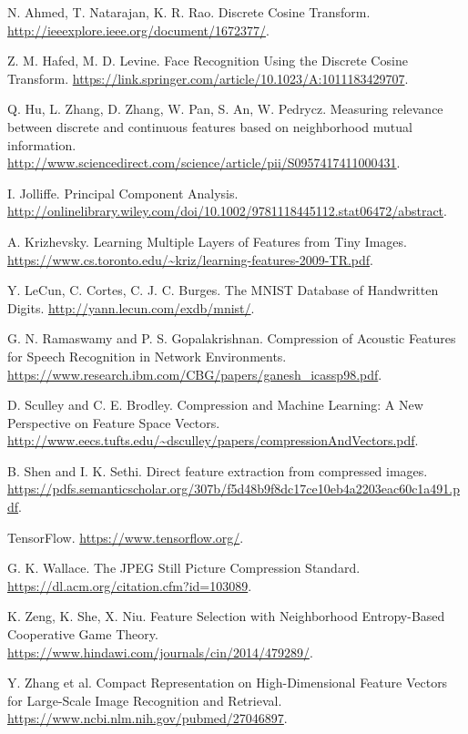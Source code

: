 \documentclass[12pt]{article}
\begin{document}
\begin{thebibliography}{9}

 N. Ahmed, T. Natarajan, K. R. Rao. Discrete Cosine Transform. \url{http://ieeexplore.ieee.org/document/1672377/}.

 Z. M. Hafed, M. D. Levine.  Face Recognition Using the Discrete Cosine Transform. \url{https://link.springer.com/article/10.1023/A:1011183429707}.

 Q. Hu, L. Zhang, D. Zhang, W. Pan, S. An, W. Pedrycz.  Measuring relevance between discrete and continuous features based on neighborhood mutual information.  \url{http://www.sciencedirect.com/science/article/pii/S0957417411000431}.

 I. Jolliffe. Principal Component Analysis. \url{http://onlinelibrary.wiley.com/doi/10.1002/9781118445112.stat06472/abstract}.

 A. Krizhevsky. Learning Multiple Layers of Features from Tiny Images. \url{https://www.cs.toronto.edu/~kriz/learning-features-2009-TR.pdf}.

 Y. LeCun, C. Cortes, C. J. C. Burges. The MNIST Database of Handwritten Digits. \url{http://yann.lecun.com/exdb/mnist/}.

 G. N. Ramaswamy and P. S. Gopalakrishnan.  Compression of Acoustic Features for Speech Recognition in Network Environments. \url{https://www.research.ibm.com/CBG/papers/ganesh_icassp98.pdf}.

 D. Sculley and C. E. Brodley.  Compression and Machine Learning: A New Perspective on Feature Space  Vectors. \url{http://www.eecs.tufts.edu/~dsculley/papers/compressionAndVectors.pdf}.

 B. Shen and I. K. Sethi. Direct feature extraction from compressed images. \url{https://pdfs.semanticscholar.org/307b/f5d48b9f8dc17ce10eb4a2203eac60c1a491.pdf}.

 TensorFlow.  \url{https://www.tensorflow.org/}.

 G. K. Wallace. The JPEG Still Picture Compression Standard. \url{https://dl.acm.org/citation.cfm?id=103089}.

 K. Zeng, K. She, X. Niu.  Feature Selection with Neighborhood Entropy-Based Cooperative Game Theory.  \url{https://www.hindawi.com/journals/cin/2014/479289/}.

 Y. Zhang et al. Compact Representation on High-Dimensional Feature Vectors for Large-Scale Image Recognition and Retrieval. \url{https://www.ncbi.nlm.nih.gov/pubmed/27046897}.

\end{thebibliography}
\end{document}
